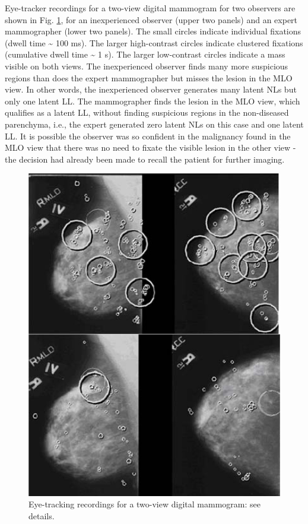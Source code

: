 \documentclass[
]{book}
\begin{document}
Eye-tracker recordings for a two-view digital mammogram for two observers are shown in Fig. \ref{fig:visual-search-eye-tracking}, for an inexperienced observer (upper two panels) and an expert mammographer (lower two panels). The small circles indicate individual fixations (dwell time \textasciitilde{} 100 ms). The larger high-contrast circles indicate clustered fixations (cumulative dwell time \textasciitilde{} 1 s). The larger low-contrast circles indicate a mass visible on both views. The inexperienced observer finds many more suspicious regions than does the expert mammographer but misses the lesion in the MLO view. In other words, the inexperienced observer generates many latent NLs but only one latent LL. The mammographer finds the lesion in the MLO view, which qualifies as a latent LL, without finding suspicious regions in the non-diseased parenchyma, i.e., the expert generated zero latent NLs on this case and one latent LL. It is possible the observer was so confident in the malignancy found in the MLO view that there was no need to fixate the visible lesion in the other view - the decision had already been made to recall the patient for further imaging.

\begin{figure}

{\centering \includegraphics{images/15-visual-search/eye-tracking-4-images} 

}

\caption{Eye-tracking recordings for a two-view digital mammogram: see details.}\label{fig:visual-search-eye-tracking}
\end{figure}
\end{document}
